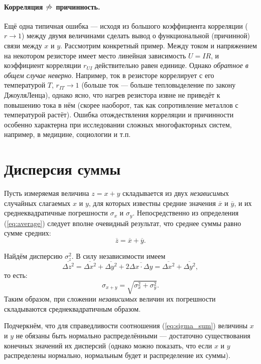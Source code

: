 \paragraph{Корреляция $\protect\not\Rightarrow$ причинность.}

Ещё одна типичная ошибка --- исходя из большого
коэффициента корреляции ($r\to1$) между двумя величинами сделать
вывод о функциональной (причинной) связи между $x$ и $y$. Рассмотрим
конкретный пример. Между током и напряжением на некотором резисторе
имеет место линейная зависимость $U=IR$, и коэффициент корреляции
$r_{UI}$ действительно равен единице. Однако \emph{обратное
в общем случае неверно}. Например, ток в резисторе коррелирует
с его температурой $T$, $r_{IT}\to1$ (больше ток --- больше
тепловыделение по закону Джоуля\textendash Ленца), однако ясно, что
нагрев резистора извне не приведёт к повышению тока в нём (скорее
наоборот, так как сопротивление металлов с температурой растёт). Ошибка
отождествления корреляции и причинности особенно характерна при исследовании
сложных многофакторных систем, например, в медицине, социологии и
т.п.

\section{Дисперсия суммы}

Пусть измеряемая величина $z=x+y$ складывается из двух \emph{независимы}х
случайных слагаемых $x$ и $y$, для которых известны средние значения
$\overline{x}$ и $\overline{y}$, и их среднеквадратичные погрешности
$\sigma_{x}$ и $\sigma_{y}$. Непосредственно из определения (\ref{eq:average})
следует вполне очевидный результат, что среднее суммы равно сумме
средних: 
\[
\overline{z}=\overline{x}+\overline{y}.
\]

Найдём дисперсию $\sigma_{z}^{2}$. В силу независимости имеем
\[
\overline{\Delta z^{2}}=\overline{\Delta x^{2}}+\overline{\Delta y^{2}}+2\overline{\Delta x\cdot\Delta y}=\overline{\Delta x^{2}}+\overline{\Delta y^{2}},
\]
то есть:
\begin{equation}
\boxed{{\sigma_{x+y}=\sqrt{\sigma_{x}^{2}+\sigma_{y}^{2}}}}.\label{eq:sigma_sum}
\end{equation}
Таким образом, при сложении \emph{независимых }величин их погрешности
складываются среднеквадратичным образом.

Подчеркнём, что для справедливости соотношения (\ref{eq:sigma_sum})
величины $x$ и $y$ не обязаны быть нормально распределёнными ---
достаточно существования конечных значений их дисперсий (однако можно
показать, что если $x$ и $y$ распределены нормально, нормальным
будет и распределение их суммы).

